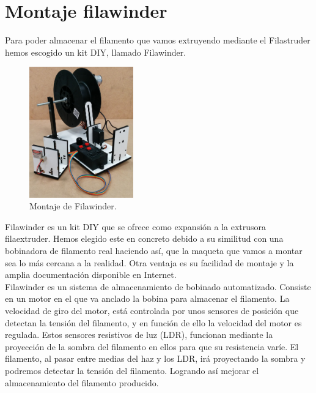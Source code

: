 \chapter{Montaje filawinder}
\label{ane:filawinder}
Para poder almacenar el filamento que vamos extruyendo mediante el Filastruder hemos escogido un kit DIY, llamado Filawinder\cite{filawinder}. 

    \begin{figure}[H]
            \centering
            \includegraphics[width=0.4\textwidth]{images/filawinder/IMG_20150313_103643.jpg}
            \caption{Montaje de Filawinder.}
            \label{fig:winder_winder}
    \end{figure}

Filawinder es un kit DIY que se ofrece como expansión a la extrusora  filaextruder. Hemos elegido este en concreto debido a su similitud con una bobinadora de filamento real haciendo así, que la maqueta que vamos a montar sea lo más cercana a la realidad. Otra ventaja es su facilidad de montaje y la amplia documentación disponible en Internet.\\

Filawinder es un sistema de almacenamiento de bobinado automatizado. Consiste en un motor en el que va anclado la bobina para almacenar el filamento. La velocidad de giro del motor, está controlada por unos sensores de posición que detectan la tensión del filamento, y en función de ello la velocidad del motor es regulada. Estos sensores resistivos de luz (LDR), funcionan mediante la proyección de la sombra del filamento en ellos para que su resistencia varíe. El filamento, al pasar entre medias del haz y los LDR, irá proyectando la sombra y podremos detectar la tensión del filamento. Logrando así mejorar el almacenamiento del filamento producido.

